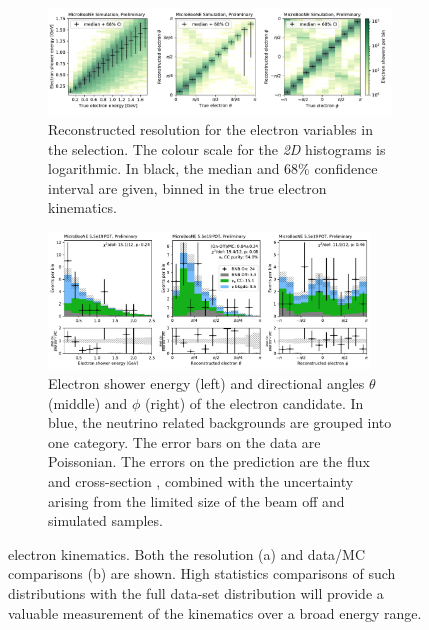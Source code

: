 \begin{figure}[htb] 
\begin{center}
    \begin{subfigure}{\textwidth}
    \centering
    \includegraphics[width=\textwidth]{NueCCsel/Images/truth/electron_resolution.pdf}
    \caption{\label{fig:final_nue:reso}  Reconstructed resolution for the electron variables in the \nuecc selection. The colour scale for the \textit{2D} histograms is logarithmic. In black, the median and 68\% confidence interval are given, binned in the true electron kinematics.\\}
    \end{subfigure}
    \begin{subfigure}{\textwidth}
    \centering
    \includegraphics[width=0.94\textwidth]{NueCCsel/Images/datamc/event_e_kinematics.pdf}
    \caption{\label{fig:final_nue:datamcafter} Electron shower energy (left) and directional angles $\theta$ (middle) and $\phi$ (right) of the \nuecc electron candidate. In blue, the neutrino related backgrounds are grouped into one category. The error bars on the data are Poissonian. The errors on the prediction are the flux and cross-section \systs, combined with the uncertainty arising from the limited size of the beam off and simulated samples.}
    \end{subfigure}
\caption[Lepton kinematics for the \nuecc channel. Both resolution and data/MC comparisons are shown]{\label{fig:final_nue} \nuecc electron kinematics. Both the resolution (a) and data/MC comparisons (b) are shown. High statistics comparisons of such distributions with the full data-set distribution will provide a valuable measurement of the \nue kinematics over a broad energy range.}
\end{center}
\end{figure}

